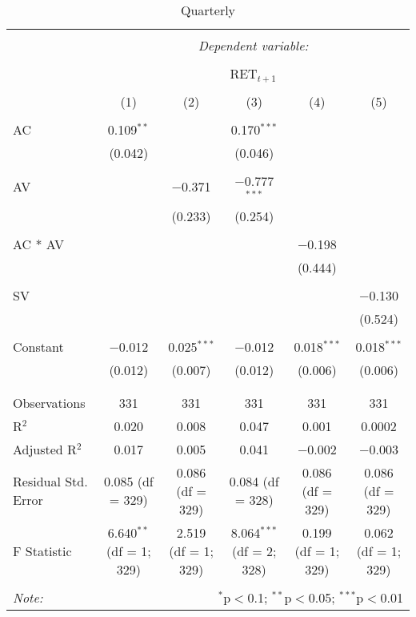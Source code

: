 
\begin{table}[!htbp] \centering 
  \caption{Quarterly} 
  \label{} 
\begin{adjustbox}{width=1\textwidth}
	\begin{tabular}{@{\extracolsep{5pt}}lccccc} 
\\[-1.8ex]\hline 
\hline \\[-1.8ex] 
 & \multicolumn{5}{c}{\textit{Dependent variable:}} \\ 
\cline{2-6} 
\\[-1.8ex] & \multicolumn{5}{c}{RET$_{t+1}$} \\ 
\\[-1.8ex] & (1) & (2) & (3) & (4) & (5)\\ 
\hline \\[-1.8ex] 
 AC & 0.109$^{**}$ &  & 0.170$^{***}$ &  &  \\ 
  & (0.042) &  & (0.046) &  &  \\ 
  & & & & & \\ 
 AV &  & $-$0.371 & $-$0.777$^{***}$ &  &  \\ 
  &  & (0.233) & (0.254) &  &  \\ 
  & & & & & \\ 
 AC * AV &  &  &  & $-$0.198 &  \\ 
  &  &  &  & (0.444) &  \\ 
  & & & & & \\ 
 SV &  &  &  &  & $-$0.130 \\ 
  &  &  &  &  & (0.524) \\ 
  & & & & & \\ 
 Constant & $-$0.012 & 0.025$^{***}$ & $-$0.012 & 0.018$^{***}$ & 0.018$^{***}$ \\ 
  & (0.012) & (0.007) & (0.012) & (0.006) & (0.006) \\ 
  & & & & & \\ 
\hline \\[-1.8ex] 
Observations & 331 & 331 & 331 & 331 & 331 \\ 
R$^{2}$ & 0.020 & 0.008 & 0.047 & 0.001 & 0.0002 \\ 
Adjusted R$^{2}$ & 0.017 & 0.005 & 0.041 & $-$0.002 & $-$0.003 \\ 
Residual Std. Error & 0.085 (df = 329) & 0.086 (df = 329) & 0.084 (df = 328) & 0.086 (df = 329) & 0.086 (df = 329) \\ 
F Statistic & 6.640$^{**}$ (df = 1; 329) & 2.519 (df = 1; 329) & 8.064$^{***}$ (df = 2; 328) & 0.199 (df = 1; 329) & 0.062 (df = 1; 329) \\ 
\hline 
\hline \\[-1.8ex] 
\textit{Note:}  & \multicolumn{5}{r}{$^{*}$p$<$0.1; $^{**}$p$<$0.05; $^{***}$p$<$0.01} \\ 
\end{tabular} 
\end{adjustbox}
\end{table} 
